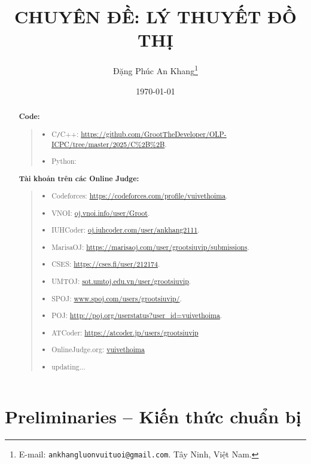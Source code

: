 \documentclass{article}
\title{CHUYÊN ĐỀ: LÝ THUYẾT ĐỒ THỊ}
\author{Đặng Phúc An Khang\footnote{ E-mail: {\tt ankhangluonvuituoi@gmail.com}. Tây Ninh, Việt Nam.}}
\date{\today}
\begin{document}
\maketitle
\begin{abstract}
	
	
	\textbf{Code:}
	\begin{quote}
		\begin{itemize}
			\item C{\tt/}C++: \url{https://github.com/GrootTheDeveloper/OLP-ICPC/tree/master/2025/C%2B%2B}.
			\item Python: \url{}\\
		\end{itemize}
	\end{quote}
	
	\textbf{Tài khoản trên các Online Judge:}
	\begin{quote}
    	\begin{itemize}
			\item Codeforces: \url{https://codeforces.com/profile/vuivethoima}.
			\item VNOI: \url{oj.vnoi.info/user/Groot}.
			\item IUHCoder: \url{oj.iuhcoder.com/user/ankhang2111}.
			\item MarisaOJ: \url{https://marisaoj.com/user/grootsiuvip/submissions}.
			\item CSES: \url{https://cses.fi/user/212174}.
			\item UMTOJ: \url{sot.umtoj.edu.vn/user/grootsiuvip}.
			\item SPOJ: \url{www.spoj.com/users/grootsiuvip/}.
			\item POJ: \url{http://poj.org/userstatus?user_id=vuivethoima}.
			\item ATCoder: \url{https://atcoder.jp/users/grootsiuvip}
			\item OnlineJudge.org: \url{vuivethoima}
			\item updating...
		\end{itemize}
	\end{quote}
    
\end{abstract}
\tableofcontents


\section{Preliminaries -- Kiến thức chuẩn bị}
\end{document}
